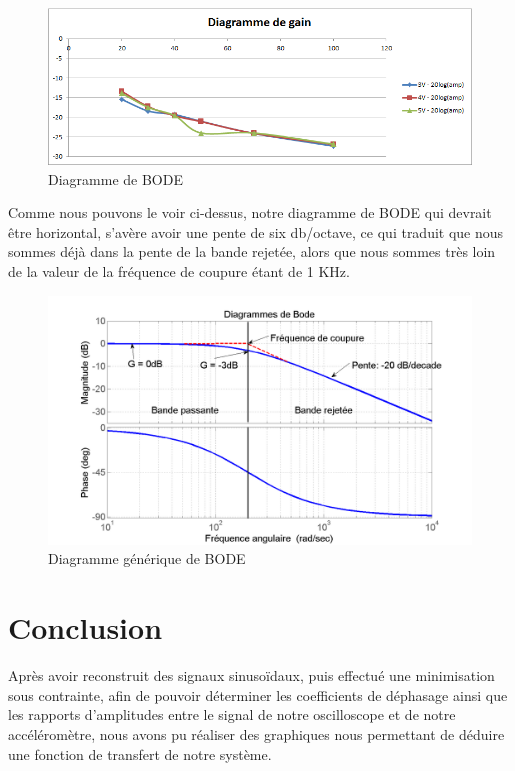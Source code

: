 \documentclass[french,a4paper,12pt]{report}
\begin{document}
	\begin{figure}[!ht]
    \center
  	\includegraphics[width=15cm]{baud.png}
    \caption{Diagramme de BODE}
	\end{figure}	
	
	Comme nous pouvons le voir ci-dessus, notre diagramme de BODE qui devrait être horizontal, s'avère avoir une pente de six db/octave, ce qui traduit que nous sommes déjà dans la pente de la bande rejetée, alors que nous sommes très loin de la valeur de la fréquence de coupure étant de 1 KHz.
	
	\begin{figure}[!ht]
    \center
  	\includegraphics[width=15cm]{bode.png}
    \caption{Diagramme générique de BODE}
	\end{figure}
	
\newpage	
	
		\section{Conclusion}
			Après avoir reconstruit des signaux sinusoïdaux, puis effectué une minimisation sous contrainte, afin de pouvoir déterminer les coefficients de déphasage ainsi que les rapports d'amplitudes entre le signal de notre oscilloscope et de notre accéléromètre, nous avons pu réaliser des graphiques nous permettant de déduire une fonction de transfert de notre système.
			
\end{document}

